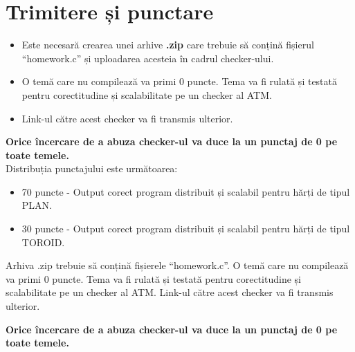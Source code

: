 \documentclass{article}
\newcounter{ProblemCounter} %
\newcommand{\ProblemName}{}
\newenvironment{Problem}[1][Sectiunea \arabic{ProblemCounter}]{ %
\stepcounter{ProblemCounter} %
\renewcommand{\ProblemName}{#1} %
\section{\ProblemName} %
}{}
\begin{document}
\section {}

\begin{Problem}[Trimitere și punctare]

\begin{itemize}
    \item Este necesară crearea unei arhive \textbf{.zip} care trebuie să conțină fișierul ``homework.c'' și uploadarea acesteia în cadrul checker-ului.
    \item O temă care nu compilează va primi 0 puncte. Tema va fi rulată și testată pentru corectitudine și scalabilitate pe un checker al ATM.
    \item Link-ul către acest checker va fi transmis ulterior.\\
\end{itemize}

\textbf{Orice încercare de a abuza checker-ul va duce la un punctaj de 0 pe toate temele.} \\

Distribuția punctajului este următoarea:
\begin{itemize}
    \item 70 puncte - Output corect program distribuit și scalabil pentru hărți de tipul PLAN.
    \item 30 puncte - Output corect program distribuit și scalabil pentru hărți de tipul TOROID.
\end{itemize}

Arhiva .zip trebuie să conțină fișierele ``homework.c''. O temă care nu compilează va primi 0 puncte. Tema va fi rulată și testată pentru corectitudine și scalabilitate pe un checker al ATM. Link-ul către acest checker va fi transmis ulterior.

\textbf{Orice încercare de a abuza checker-ul va duce la un punctaj de 0 pe toate temele.}

\end{Problem}
\end{document}
